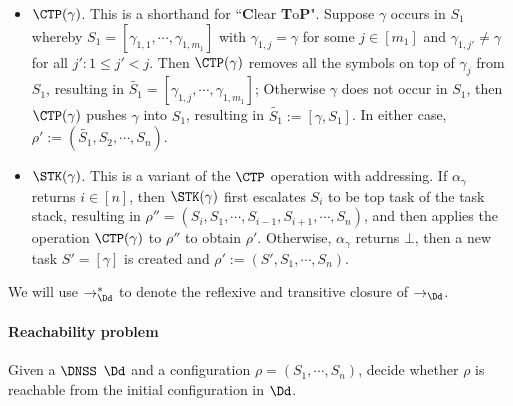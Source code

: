\begin{itemize}
\begin{itemize}
	\item $\CTP(\gamma)$. This is a shorthand for ``\textbf{C}lear \textbf{T}o\textbf{P}". Suppose $\gamma$ occurs in $S_1$ whereby $S_1=[\gamma_{1,1}, \cdots, \gamma_{1,m_1}]$ with $\gamma_{1,j} =\gamma$ for some $j \in [m_1]$ and $\gamma_{1,j'} \neq \gamma$ for all $j': 1 \le j' < j$. Then $\CTP(\gamma)$ removes all the symbols on top of $\gamma_j$ from $S_1$, resulting in $\widetilde{S_1} = [\gamma_{1,j}, \cdots, \gamma_{1,m_1}]$; %
%
Otherwise $\gamma$ does not occur in $S_1$, then $\CTP(\gamma)$ pushes $\gamma$ into $S_1$, resulting in $\widetilde{S_1} := [\gamma, S_1]$. In either case, $\rho':=(\widetilde{S_1}, S_2, \cdots, S_n)$.  
\item $\STK(\gamma)$. This is a variant of the $\CTP$ operation with addressing. 
	 If $\alpha_\gamma$ returns $i \in [n]$, then $\STK(\gamma)$ first escalates $S_i$ to be top task of the task stack, resulting in $\rho''=(S_i, S_1, \cdots, S_{i-1}, S_{i+1}, \cdots, S_n)$, and then applies the operation $\CTP(\gamma)$ to $\rho''$ to obtain $\rho'$. 	 
	 Otherwise, $\alpha_\gamma$ returns $\bot$, then a new task $S'=[\gamma]$ is created and $\rho':=(S', S_1, \cdots, S_n)$.
\end{itemize}
We will use $\rightarrow_\Dd^*$ to denote the reflexive and transitive closure of $\rightarrow_\Dd$.

\paragraph{Reachability problem} Given a $\DNSS$ $\Dd$ and a configuration $\rho = (S_1, \cdots, S_n)$, decide whether $\rho$ is reachable from the initial configuration in $\Dd$.
\end{itemize}





